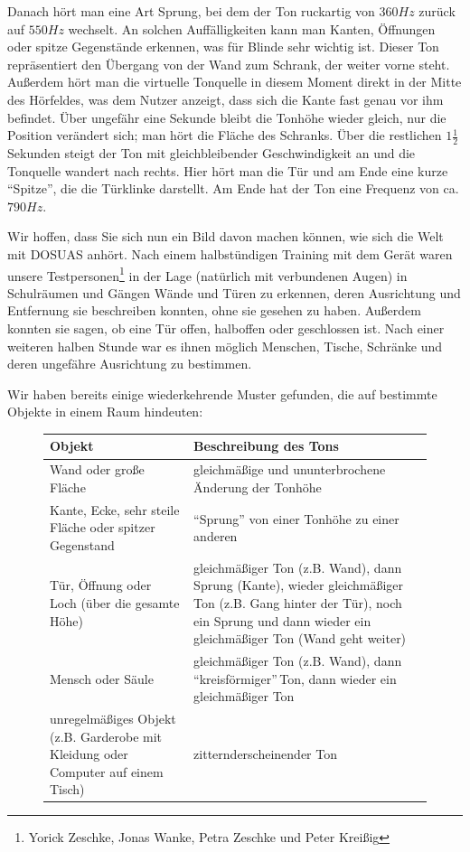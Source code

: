 \documentclass[a4paper,12pt,ngerman]{scrartcl}
\begin{document}
Danach hört man eine Art Sprung, bei dem der Ton ruckartig von $360 Hz$ zurück auf $550 Hz$ wechselt. An solchen Auffälligkeiten kann man Kanten, Öffnungen oder spitze Gegenstände erkennen, was für Blinde sehr wichtig
ist. Dieser Ton repräsentiert den Übergang von der Wand zum Schrank, der weiter vorne steht. Außerdem hört
man die virtuelle Tonquelle in diesem Moment direkt in der Mitte des Hörfeldes, was dem Nutzer anzeigt, dass sich
die Kante fast genau vor ihm befindet. Über ungefähr eine Sekunde bleibt die Tonhöhe wieder gleich, nur die Position
verändert sich; man hört die Fläche des Schranks. Über die restlichen $1\frac{1}{2}$ Sekunden steigt der Ton mit 
gleichbleibender Geschwindigkeit an und die Tonquelle wandert nach rechts.
Hier hört man die Tür und am Ende eine kurze \enquote{Spitze}, die die Türklinke darstellt. Am Ende hat der Ton
eine Frequenz von ca. $790 Hz$.\par 
Wir hoffen, dass Sie sich nun ein Bild davon machen können, wie sich die Welt mit DOSUAS anhört. Nach einem
halbstündigen Training mit dem Gerät waren unsere Testpersonen\footnote{Yorick Zeschke, Jonas Wanke, Petra Zeschke und Peter Kreißig} in der Lage (natürlich mit verbundenen Augen) in Schulräumen und Gängen
Wände und Türen zu erkennen, deren Ausrichtung und Entfernung sie beschreiben konnten, ohne sie gesehen zu haben.
Außerdem konnten sie sagen, ob eine Tür offen, halboffen oder geschlossen ist. Nach einer weiteren halben Stunde
war es ihnen möglich Menschen, Tische, Schränke und deren ungefähre Ausrichtung zu bestimmen. \par
Wir haben bereits einige wiederkehrende Muster gefunden, die auf bestimmte Objekte in einem Raum hindeuten:
\begin{figure}[h]
	\begin{tabular}{| p{} | p{} |}
		\hline
		\textbf{Objekt} & \textbf{Beschreibung des Tons} \\ \hline
		Wand oder große Fläche & gleichmäßige und ununterbrochene Änderung der Tonhöhe \\ \hline
		Kante, Ecke, sehr steile Fläche oder spitzer Gegenstand & \enquote{Sprung} von einer Tonhöhe zu einer 
		anderen \\ \hline
		Tür, Öffnung oder Loch (über die gesamte Höhe) & gleichmäßiger Ton (z.B. Wand), dann Sprung (Kante), wieder gleichmäßiger Ton
		(z.B. Gang hinter der Tür), noch ein Sprung und dann wieder ein gleichmäßiger Ton (Wand geht weiter) \\ \hline 
		Mensch oder Säule & gleichmäßiger Ton (z.B. Wand), dann \enquote{kreisförmiger}\footnotemark \,Ton, dann wieder ein gleichmäßiger Ton \\ \hline
		unregelmäßiges Objekt (z.B. Garderobe mit Kleidung oder Computer auf einem Tisch) & zitternd\footnotemark erscheinender Ton \\ \hline 
	\end{tabular}
\end{figure} \par
\end{document}
